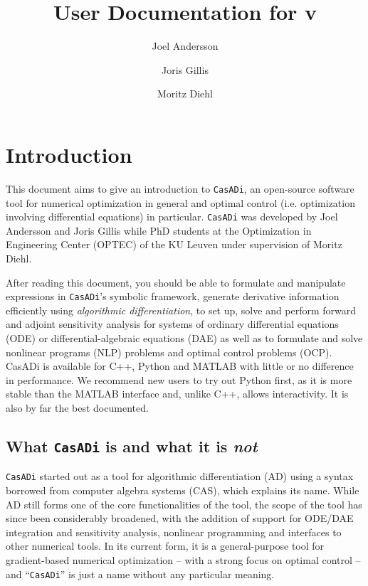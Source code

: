 \documentclass[a4paper,12pt]{book}
\author{Joel Andersson \and Joris Gillis \and Moritz Diehl}
\title{User Documentation for \CasADi v\currentversion}
\newcommand{\CasADi}{\texttt{CasADi}\xspace}
\begin{document}
\titlepage
\maketitle
\begin{latexonly}
\tableofcontents
\end{latexonly}
\clearpage

\chapter{Introduction}
This document aims to give an introduction to \CasADi, an open-source software tool for numerical optimization in
general and optimal control (i.e. optimization involving differential equations) in particular.
\CasADi was developed by Joel Andersson and Joris Gillis while PhD students at the Optimization in Engineering Center
(OPTEC) of the KU Leuven under supervision of Moritz Diehl.

After reading this document, you should be able to formulate and manipulate expressions in \CasADi's symbolic framework, generate derivative information efficiently using \emph{algorithmic differentiation}, to set up, solve and perform forward and adjoint sensitivity analysis for systems of ordinary differential equations (ODE) or differential-algebraic equations (DAE) as well as to formulate and solve nonlinear programs (NLP) problems and optimal control problems (OCP). CasADi is available for C++, Python and MATLAB with little or no difference in performance. We recommend new users to try out Python first, as it is
more stable than the MATLAB interface and, unlike C++, allows interactivity. It is also by far the best documented.

\section{What \CasADi is and what it is \emph{not}}
\CasADi started out as a tool for algorithmic differentiation (AD) using a syntax borrowed from computer algebra systems (CAS), which explains its name. While AD still forms one of the core functionalities of the tool, the scope of the tool has since been considerably broadened, with the addition of support for ODE/DAE integration and sensitivity analysis, nonlinear programming and interfaces to other numerical tools. In its current form, it is a general-purpose tool for gradient-based numerical optimization -- with a strong focus on optimal control -- and ``\CasADi'' is just a name without any particular meaning.
\end{document}
